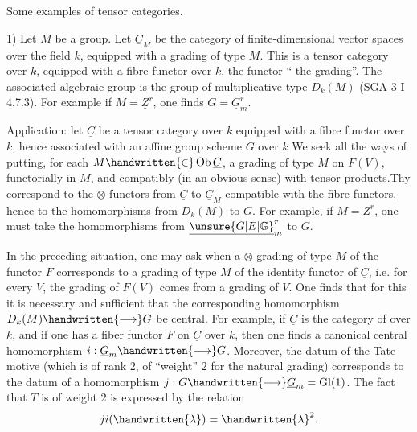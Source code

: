 
Some examples of tensor categories.

1) Let $M$ be a group. Let $\underline{C}_M$ be the category of finite-dimensional vector spaces over the field $k$, equipped with a grading of type $M$. This is a tensor category over $k$, equipped with a fibre functor over $k$, the functor `` the grading''. The associated algebraic group is the group of multiplicative type $D_k(M)$ (SGA 3 I 4.7.3). For example if $M=\underline{Z}^r$, one finds $G=\underline{G}_m^r$.

Application: let $\underline{C}$ be a tensor category over $k$ equipped with a fibre functor  over $k$, hence associated with an affine group scheme $G$ over $k$ We seek all the ways of putting, for each $M\handwritten{\in}\operatorname{Ob}\underline{C}$, a grading of type $M$ on $F(V)$, functorially in $M$, and compatibly (in an obvious sense) with tensor products.Thy correspond to the $\otimes$-functors from $\underline{C}$ to $\underline{C}_M$ compatible with the fibre functors, hence to the homomorphisms from $D_k(M)$ to $G$. For example, if $M=\underline{Z}^r$, one must take the homomorphisms from $\underline{\unsure{G|E|\mathbb{G}}}_m^r$ to $G$.

In the preceding situation, one may ask when a $\otimes$-grading of type $M$ of the functor $F$ corresponds to a grading of type $M$ of the identity functor of $\underline{C}$, i.e. for every $V$, the grading of $F(V)$ comes from a grading of $V$. One finds that for this it is necessary and sufficient that the corresponding homomorphism $D_k(M)\handwritten{\longrightarrow}G$ be central. For example, if $\underline{C}$ is the category of  over $k$, and if one has a fiber functor $F$ on $\underline{C}$ over $k$, then one finds a canonical central homomorphism $i:\underline{G}_m\handwritten{\longrightarrow}G$. Moreover, the datum of the Tate motive (which is of rank $2$,  of ``weight'' $2$ for the natural grading) corresponds to  the datum of a homomorphism $j:G\handwritten{\longrightarrow}\underline{G}_m=\operatorname{Gl}(1)$. The fact that $T$ is of weight $2$ is expressed by the relation
\[
ji(\handwritten{\lambda})=\handwritten{\lambda}^{2}.
\]
